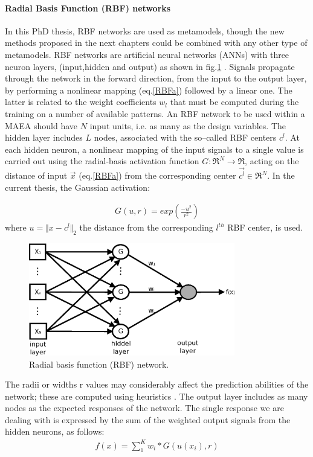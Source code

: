 \paragraph{Radial Basis Function (RBF) networks}
In this PhD thesis, RBF networks are used as metamodels, though the new methods proposed in the next chapters could be combined with any other type of metamodels. RBF networks are artificial neural networks (ANNs) with three neuron layers, (input,hidden and output) as shown in fig.\ref{rbf1} \cite{Haykin}. Signals propagate through the network in the forward direction, from the input to the output layer, by performing a nonlinear mapping (eq.\ref{RBFa}) followed by a linear one. The latter is related to the weight coefficients $w_l$ that must be computed during the training on a number of available patterns. An RBF network to be used within a MAEA should have $N$ input units, i.e. as many as the  design variables. The hidden layer includes $L$ nodes, associated with the so–called RBF centers $c^l$. At each hidden neuron, a nonlinear mapping of the input signals to a single value is carried out using the radial-basis activation function $G:\Re^N \rightarrow \Re$, acting on the distance of input $\vec{x}$ (eq.\ref{RBFa}) from the corresponding center $\vec{c^l} \in \Re^N$.  In the current thesis, the Gaussian activation: 

\begin{eqnarray}
	G(u,r)=exp(\frac{-u^2}{r^2})
	\label{RBFa}
\end{eqnarray}  
where $u=\Vert x-c^l \Vert_2$ the distance from the corresponding $l^{th}$ RBF center, is used.

\begin{figure}[h!]
\centering
\includegraphics[width=90mm]{RBF.eps} 
\caption{Radial basis function (RBF) network.}
\label{rbf1}
\end{figure}
The radii or widths r values may considerably affect the prediction abilities of the network; these are computed using heuristics \cite{Haykin}. The output layer includes as many nodes as the expected responses of the network. The single response we are dealing with is expressed by the sum of the weighted output signals from the hidden neurons, as follows:             
\begin{eqnarray}
	f(x)=\sum _1^K w_i*G(u(x_i),r)
\label{response}
\end{eqnarray}  

